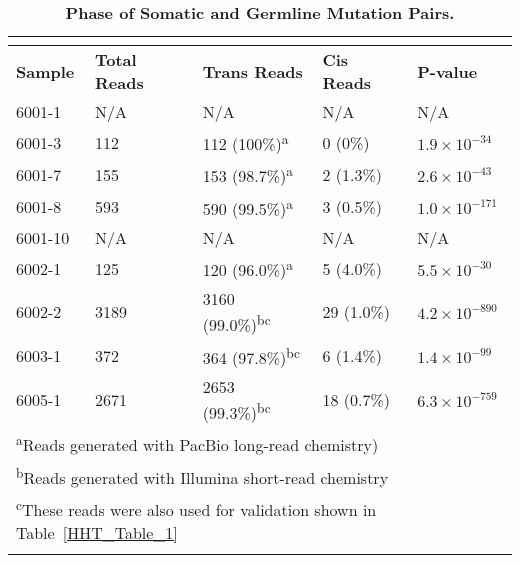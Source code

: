 \begin{table}[]
\footnotesize
\renewcommand{\arraystretch}{1.4} 
\centering
\caption[Phase of Somatic and Germline Mutation Pairs]{\textbf{Phase of Somatic and Germline Mutation Pairs.}}

\begin{tabularx}{0.75\linewidth}{lllll}
\multicolumn{5}{l}{} \\
\toprule
\textbf{Sample} & \textbf{Total Reads} & \textbf{Trans Reads} & \textbf{Cis Reads} & \textbf{P-value} \\
\midrule
6001-1	& N/A	& N/A						& N/A		& N/A \\\hline
6001-3	& 112	& 112 (100\%)\textsuperscript{a}	& 0 (0\%)		& $1.9\times10^{-34}$ \\\hline
6001-7	& 155	& 153 (98.7\%)\textsuperscript{a}	& 2 (1.3\%)	& $2.6\times10^{-43}$ \\\hline
6001-8	& 593	& 590 (99.5\%)\textsuperscript{a}	& 3 (0.5\%)	& $1.0\times10^{-171}$ \\\hline
6001-10	& N/A	& N/A						& N/A		& N/A \\\hline
6002-1	& 125	& 120 (96.0\%)\textsuperscript{a}	& 5 (4.0\%)	& $5.5\times10^{-30}$ \\\hline
6002-2	& 3189	& 3160 (99.0\%)\textsuperscript{bc}	& 29 (1.0\%)	& $4.2\times10^{-890}$ \\\hline
6003-1	& 372	& 364 (97.8\%)\textsuperscript{bc}	& 6 (1.4\%)	& $1.4\times10^{-99}$ \\\hline
6005-1	& 2671	& 2653 (99.3\%)\textsuperscript{bc}	& 18 (0.7\%)	& $6.3\times10^{-759}$ \\

\bottomrule
\multicolumn{5}{l}{\textsuperscript{a}Reads generated with PacBio long-read chemistry)} \\
\multicolumn{5}{l}{\textsuperscript{b}Reads generated with Illumina short-read chemistry} \\
\multicolumn{5}{l}{\textsuperscript{c}These reads were also used for validation shown in Table~\ref{HHT_Table_1}} \\
\label{HHT_Table_2}
\end{tabularx}

\end{table}



